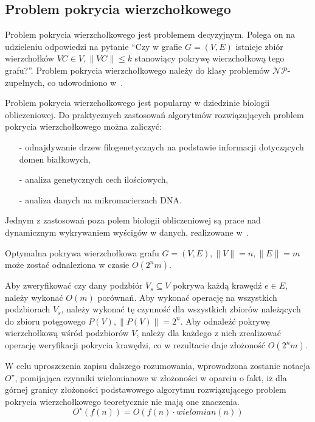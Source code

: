 \subsection{Problem pokrycia wierzchołkowego}\label{s_vertex_cover_domain}
\par{
  Problem pokrycia wierzchołkowego jest problemem decyzyjnym.
  Polega on na udzieleniu odpowiedzi na pytanie ``Czy w grafie $G=(V,E)$ istnieje 
  zbiór wierzchołków $VC \in V, \|VC\| \leq k$ stanowiący pokrywę wierzchołkową
  tego grafu?''.
  Problem pokrycia wierzchołkowego należy do klasy problemów 
  $\mathcal{NP}$-zupełnych, co udowodniono w~\cite{Kar72}.
}
\par{
  Problem pokrycia wierzchołkowego jest popularny w dziedzinie biologii
  obliczeniowej. 
  Do praktycznych zastosowań algorytmów rozwiązujących problem pokrycia
  wierzchołkowego można zaliczyć:
  \begin{itemize}
    \item[-] odnajdywanie drzew filogenetycznych na podstawie informacji
      dotyczących domen białkowych,
    \item[-] analiza genetycznych cech ilościowych,
    \item[-] analiza danych na mikromacierzach DNA.\@
  \end{itemize}

  Jednym z zastosowań poza polem biologii obliczeniowej są prace nad dynamicznym
  wykrywaniem wyścigów w danych, realizowane
  w~\cite{O'Callahan:2003:HDD:781498.781528}.
}
\begin{theorem}
  Optymalna pokrywa wierzchołkowa grafu $G=(V,E), \|V\|=n, \|E\|=m$ może zostać 
  odnaleziona w czasie $O(2^{n}m)$.
\end{theorem}
\begin{bproof}
  Aby zweryfikować czy dany podzbiór $V_s \subseteq V$ pokrywa każdą krawędź
  $e \in E$, należy wykonać $O(m)$ porównań.
  Aby wykonać operację na wszystkich podzbiorach $V_s$, należy wykonać tę
  czynność dla wszystkich zbiorów należących do zbioru potęgowego 
  $P(V), \|P(V)\| = 2^{n}$.
  Aby odnaleźć pokrywę wierzchołkową wśród podzbiorów $V$, należy dla każdego z
  nich zrealizować operację weryfikacji pokrycia krawędzi, co w rezultacie daje 
  złożoność $O(2^{n}m)$.
\end{bproof}

W celu uproszczenia zapisu dalszego rozumowania, wprowadzona zostanie notacja
$O^{\star}$, pomijająca czynniki wielomianowe w złożoności w oparciu o fakt, 
iż dla górnej granicy złożoności podstawowego algorytmu rozwiązującego problem 
pokrycia wierzchołkowego teoretycznie nie mają one znaczenia.
\begin{equation*}
  O^{\star}(f(n))=O(f(n) \cdot wielomian(n))
\end{equation*}

